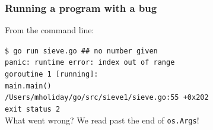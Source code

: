 \documentclass[handout,compress,t,11pt]{beamer}
\begin{document}
\begin{frame}[fragile]
    \frametitle{Running a program with a bug}
    From the command line: \par
    \vspace{\baselineskip}
    {\small\tt \$ go run sieve.go \:\:\: \alert{\#\# no number given} \\
    panic: runtime error: index out of range \\

    goroutine 1 [running]: \\
    main.main() \\
    	/Users/mholiday/go/src/sieve1/sieve.go:55 +0x202 \\
    exit status 2 }\\
    \vspace{1.5\baselineskip}
    What went wrong? We read past the end of \verb|os.Args|! \par
\end{frame}


%
%
%
%
%
%
%
\end{document}
